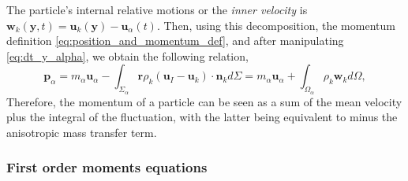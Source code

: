 The particle's internal relative motions or the \textit{inner velocity} is $\textbf{w}_k(\textbf{y},t) = \textbf{u}_k(\textbf{y}) - \textbf{u}_\alpha(t)$.
Then, using this decomposition, the momentum definition \ref{eq:position_and_momentum_def}, and after manipulating \ref{eq:dt_y_alpha}, we obtain the following relation,
\begin{equation}
    \textbf{p}_\alpha
    =  m_\alpha \textbf{u}_\alpha
    - \int_{\Sigma_\alpha} \textbf{r} \rho_k (\textbf{u}_I - \textbf{u}_k)\cdot \textbf{n}_k d\Sigma
    = m_\alpha \textbf{u}_\alpha
    + \int_{\Omega_\alpha} \rho_k \textbf{w}_k d\Omega,
    \label{eq:momentum_definition}
\end{equation}
Therefore, the momentum of a particle can be seen as a sum of the mean velocity plus the integral of the fluctuation, with the latter being equivalent to minus the anisotropic mass transfer term. 

\subsubsection*{First order moments equations}

